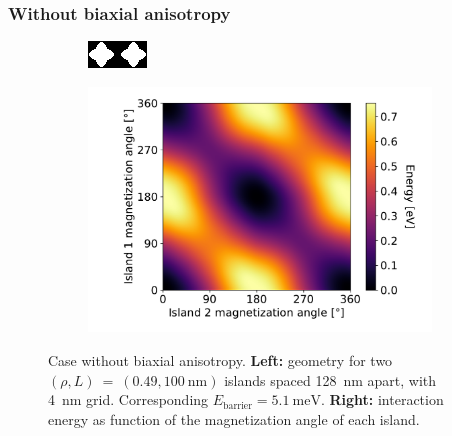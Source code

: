 \documentclass[11pt,a4paper,english,twoside]{article}
\begin{document}
\subsubsection{Without biaxial anisotropy}
\begin{figure}[b!]
    \centering
    \begin{subfigure}[c]{4cm} %
         \centering
         \includegraphics[width=\textwidth]{Figures/two_islands/Geometry/geom_r0.49_s100_d128_a0,0_cell4nm.png}
     \end{subfigure}
    \begin{subfigure}[c]{0.6\columnwidth}
         \centering
         \includegraphics[width=\textwidth]{Figures/two_islands/EnergyLandscape/Int_a0Pi,0Pi_d128_r0.49,0.49_cell4nm.pdf}
     \end{subfigure}
    \caption{Case without biaxial anisotropy. \textbf{Left:} geometry for two $(\rho, L)~=~(0.49, \SI{100}{\nano\metre})$ islands spaced \SI{128}{\nano\metre} apart, with \SI{4}{\nano\metre} grid. Corresponding $E_\mathrm{barrier}=\SI{5.1}{\milli\electronvolt}$. \textbf{Right:} interaction energy as function of the magnetization angle of each island.}
    \label{fig:two-islands_interaction_(r0.49_L100)_a0and0}
\end{figure}
\end{document}
